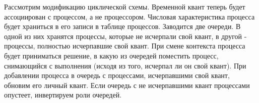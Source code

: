 Рассмотрим модификацию циклической схемы. Временной квант теперь будет ассоциирован с процессом, а не процессором. Числовая характеристика процесса будет храниться в его записи в таблице процессов. Заводится две очереди. В одной из них хранятся процессы, которые не исчерпали свой квант, в другой - процессы, полностью исчерпавшие свой квант.
При смене контекста процесса будет приниматься решение, в какую из очередей поместить процесс, снимающийся с выполнения (исходя из того, исчерпал ли он свой квант). При добавлении процесса в очередь с процессами, исчерпавшими свой квант, обновим его личный квант. Если очередь с не исчерпавшими квант процессами опустеет, инвертируем роли очередей.